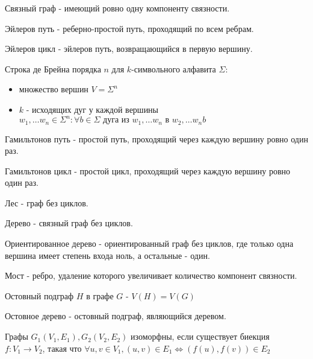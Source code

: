 \documentclass[12pt]{article}
\begin{document}
\begin{defn}
    Связный граф - имеющий ровно одну компоненту связности.
\end{defn}
\begin{defn}
    Эйлеров путь - реберно-простой путь, проходящий по всем ребрам.
\end{defn}
\begin{defn}
    Эйлеров цикл - эйлеров путь, возвращающийся в первую вершину.
\end{defn}
\begin{defn}
    Строка де Брейна порядка $n$ для $k$-символьного алфавита $\Sigma $:
    \begin{itemize}
	\item множество вершин $V = \Sigma ^n$ 
	\item $k$ - исходящих дуг у каждой вершины $w_1, \ldots w_n \in \Sigma ^n: \forall b \in  \Sigma \mbox{ дуга из } w_1, \ldots w_n \mbox{ в } w_2, \ldots w_n b$
    \end{itemize}
\end{defn}
\begin{defn}
    Гамильтонов путь - простой путь, проходящий через каждую вершину ровно один раз.
\end{defn}
\begin{defn}
    Гамильтонов цикл - простой цикл, проходящий через каждую вершину ровно один раз.
\end{defn}
\begin{defn}
    Лес - граф без циклов.
\end{defn}
\begin{defn}
    Дерево - связный граф без циклов.
\end{defn}
\begin{defn}
    Ориентированное дерево - ориентированный граф без циклов, где только одна вершина имеет степень входа ноль, а остальные - один.
\end{defn}
\begin{defn}
    Мост - ребро, удаление которого увеличивает количество компонент связности.
\end{defn}
\begin{defn}
    Остовный подграф $H$ в графе $G$ - $V(H) = V(G)$
\end{defn}
\begin{defn}
   Остовное дерево - остовный подграф, являющийся деревом.
\end{defn}
\begin{defn}
    Графы $G_1(V_1, E_1) , G_2(V_2, E_2)$ изоморфны, если существует биекция $f:V_1 \to V_2$, такая что $\forall u, v \in  V_1 , (u, v) \in  E_1 \Leftrightarrow (f(u), f(v)) \in  E_2$
\end{defn}
\end{document}
